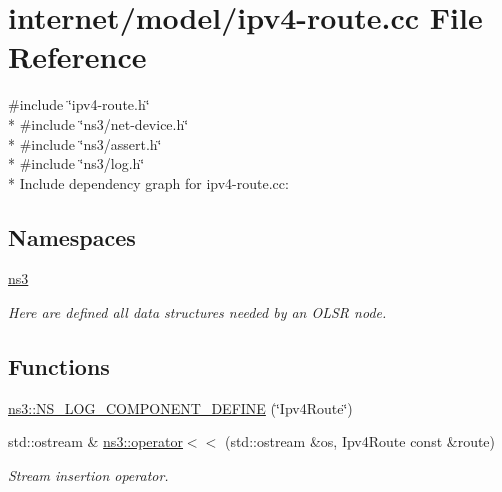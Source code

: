 \hypertarget{ipv4-route_8cc}{}\section{internet/model/ipv4-\/route.cc File Reference}
\label{ipv4-route_8cc}
{\ttfamily \#include \char`\"{}ipv4-\/route.\+h\char`\"{}}\\*
{\ttfamily \#include \char`\"{}ns3/net-\/device.\+h\char`\"{}}\\*
{\ttfamily \#include \char`\"{}ns3/assert.\+h\char`\"{}}\\*
{\ttfamily \#include \char`\"{}ns3/log.\+h\char`\"{}}\\*
Include dependency graph for ipv4-\/route.cc\+:
\subsection*{Namespaces}
\begin{DoxyCompactItemize}
\item 
 \hyperlink{namespacens3}{ns3}
\begin{DoxyCompactList}\small\item\em Here are defined all data structures needed by an O\+L\+SR node. \end{DoxyCompactList}\end{DoxyCompactItemize}
\subsection*{Functions}
\begin{DoxyCompactItemize}
\item 
\hyperlink{namespacens3_adcd82df95f9665d738e2ca8fbc208ce2}{ns3\+::\+N\+S\+\_\+\+L\+O\+G\+\_\+\+C\+O\+M\+P\+O\+N\+E\+N\+T\+\_\+\+D\+E\+F\+I\+NE} (\char`\"{}Ipv4\+Route\char`\"{})
\item 
std\+::ostream \& \hyperlink{namespacens3_a09635dd9350f3e8abcbc6cef7d0ac964}{ns3\+::operator$<$$<$} (std\+::ostream \&os, Ipv4\+Route const \&route)
\begin{DoxyCompactList}\small\item\em Stream insertion operator. \end{DoxyCompactList}\end{DoxyCompactItemize}
